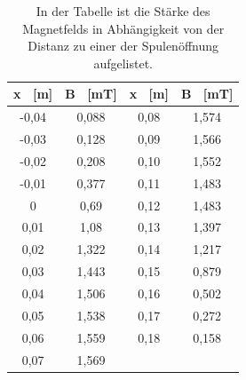 \documentclass[titlepage = firstcover]{scrartcl}
\begin{document}
                \begin{table}[h]
                    \centering 
                    \caption{In der Tabelle ist die Stärke des Magnetfelds in Abhängigkeit von der Distanz zu einer der Spulenöffnung aufgelistet.}
                    \label{tab:Spulelang}
    
                    \begin{tabular}{c c c c}
                        \toprule
                        {x \ [m]} & {B \ [mT]} & {x \ [m]} & {B \ [mT]} \\
                        \midrule
                        -0,04 & 0,088  &  0,08   & 1,574 \\
                        -0,03 & 0,128  &  0,09   & 1,566 \\
                        -0,02 & 0,208  &  0,10   & 1,552 \\
                        -0,01 & 0,377  &  0,11   & 1,483 \\
                        0     & 0,69   &  0,12   & 1,483 \\
                        0,01  & 1,08   &  0,13   & 1,397 \\
                        0,02  & 1,322  &  0,14   & 1,217 \\
                        0,03  & 1,443  &  0,15   & 0,879 \\
                        0,04  & 1,506  &  0,16   & 0,502 \\
                        0,05  & 1,538  &  0,17   & 0,272 \\
                        0,06  & 1,559  &  0,18   & 0,158 \\
                        0,07  & 1,569  &         & \\
                        \bottomrule
                    \end{tabular}                
                \end{table}
    
\end{document}
